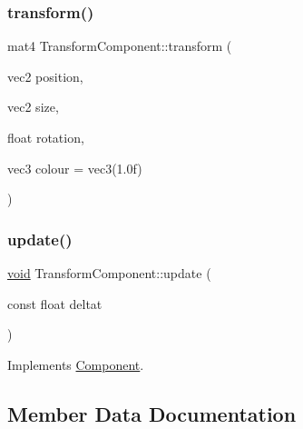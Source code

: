 \mbox{\label{classTransformComponent_af714b51390307ef9730670da044e4c2b}} 
\subsubsection{\texorpdfstring{transform()}{transform()}}
{\footnotesize\ttfamily mat4 Transform\+Component\+::transform (\begin{DoxyParamCaption}\item[{vec2}]{position,  }\item[{vec2}]{size,  }\item[{float}]{rotation,  }\item[{vec3}]{colour = {\ttfamily vec3(1.0f)} }\end{DoxyParamCaption})}

\mbox{\label{classTransformComponent_a0cd568e49687464927c79ac7ab03f004}} 
\subsubsection{\texorpdfstring{update()}{update()}}
{\footnotesize\ttfamily \hyperlink{imgui__impl__opengl3__loader_8h_ac668e7cffd9e2e9cfee428b9b2f34fa7}{void} Transform\+Component\+::update (\begin{DoxyParamCaption}\item[{const float}]{deltat }\end{DoxyParamCaption})\hspace{0.3cm}{\ttfamily [virtual]}}



Implements \hyperlink{classComponent_a3448977e6f464df89e77dda7c6f52204}{Component}.



\subsection{Member Data Documentation}
\mbox{\label{classTransformComponent_ac8a1a8fcebbb7fa0fe3be2cf7533d0fd}} 
